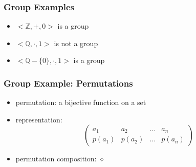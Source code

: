 \documentclass[dvipsnames]{beamer}
\begin{document}
\begin{frame}
  \frametitle{Group Examples}

  \begin{example}
    \begin{itemize}
      \item $<\mathbb{Z},+,0>$ is a group

      \pause
      \medskip
      \item $<\mathbb{Q},\cdot,1>$ is not a group
      \item $<\mathbb{Q}-\{0\},\cdot,1>$ is a group
    \end{itemize}
  \end{example}
\end{frame}

\begin{frame}
  \frametitle{Group Example: Permutations}

  \begin{itemize}
    \item permutation: a bijective function on a set

    \medskip
    \item representation:
    \[\left(
      \begin{array}{cccc}
         a_1   &  a_2   & \dots &  a_n\\
        p(a_1) & p(a_2) & \dots & p(a_n)
      \end{array}
    \right)\]

    \pause
    \medskip
    \item permutation composition: $\diamond$
  \end{itemize}
\end{frame}
\end{document}

